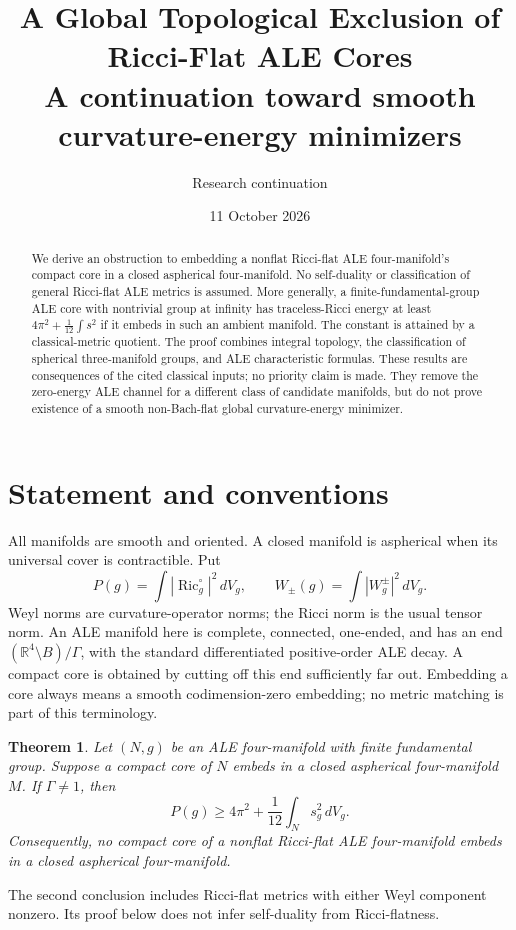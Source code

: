 \documentclass[11pt]{article}
\title{A Global Topological Exclusion of Ricci-Flat ALE Cores\\
\large A continuation toward smooth curvature-energy minimizers}
\author{Research continuation}
\date{11 October 2026}
\newtheorem{theorem}{Theorem}
\newcommand{\Ric}{\operatorname{Ric}}
\newcommand{\R}{\mathbb R}
\begin{document}
\maketitle
\begin{abstract}
We derive an obstruction to embedding a nonflat Ricci-flat ALE four-manifold's
compact core in a closed aspherical four-manifold. No self-duality or
classification of general Ricci-flat ALE metrics is assumed. More generally,
a finite-fundamental-group ALE core with nontrivial group at
infinity has traceless-Ricci energy at least $4\pi^2+\frac1{12}\int s^2$ if it embeds in such an
ambient manifold. The constant is attained by a classical-metric quotient.
The proof combines integral topology, the classification of spherical
three-manifold groups, and ALE characteristic formulas. These results are
consequences of the cited classical inputs; no priority claim is made.
They remove the zero-energy ALE channel for a different class of candidate
manifolds, but do not prove existence of a smooth non-Bach-flat global
curvature-energy minimizer.
\end{abstract}

\section{Statement and conventions}
All manifolds are smooth and oriented. A closed manifold is aspherical when its
universal cover is contractible. Put
\[
 P(g)=\int |\Ric_g^{\circ}|^2\,dV_g,\qquad
 W_\pm(g)=\int|W_g^\pm|^2\,dV_g.
\]
Weyl norms are curvature-operator norms; the Ricci norm is the usual tensor
norm. An ALE manifold here is complete, connected, one-ended, and has
an end $(\R^4\setminus B)/\Gamma$, with the standard differentiated positive-order
ALE decay. A compact core is obtained by cutting off this end sufficiently far
out. Embedding a core always means a smooth codimension-zero embedding; no
metric matching is part of this terminology.

\begin{theorem}\label{thm:main}
Let $(N,g)$ be an ALE four-manifold with finite fundamental group.
Suppose a compact core of $N$ embeds in a closed aspherical four-manifold $M$.
If $\Gamma\ne1$, then
\[
                         P(g)\ge4\pi^2+\frac1{12}\int_Ns_g^2\,dV_g.
\]
Consequently, no compact core of a nonflat Ricci-flat ALE four-manifold embeds
in a closed aspherical four-manifold.
\end{theorem}

The second conclusion includes Ricci-flat metrics with either Weyl component
nonzero. Its proof below does not infer self-duality from Ricci-flatness.
\end{document}
